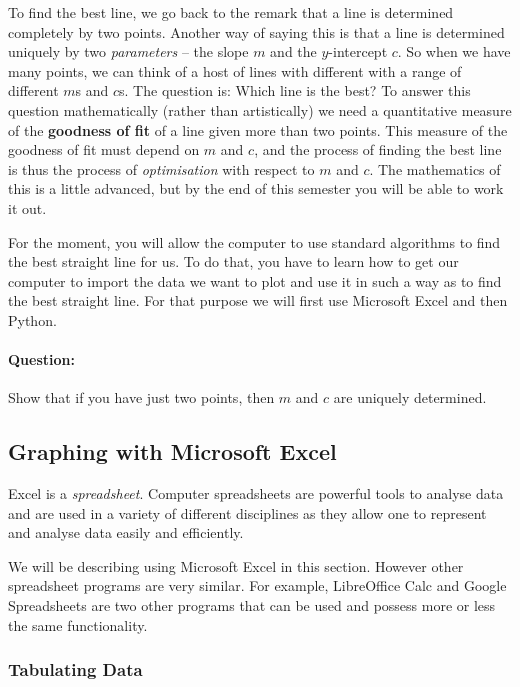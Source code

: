 To find the best line, we go back to the remark that a line is determined completely by two points. Another way of saying this is that a line is determined uniquely by two \textit{parameters} -- the slope $m$ and the $y$-intercept $c$. So when we have many points, we can think of a host of lines with different with a range of different $m$s and $c$s. The question is: Which line is the best? To answer this question mathematically (rather than artistically) we need a quantitative measure of the \textbf{goodness of fit} of a line given more than two points. This measure of the goodness of fit must depend on $m$ and $c$, and the process of finding the best line is thus the process of \textit{optimisation} with respect to $m$ and $c$. The mathematics of this is a little advanced, but by the end of this semester you will be able to work it out. 

For the moment, you will allow the computer to use standard algorithms to find the best straight line for us. To do that, you have to learn how to get our computer to import the data we want to plot and use it in such a way as to find the best straight line. For that purpose we will first use Microsoft Excel and then Python. 

\begin{question}
\paragraph{Question:} Show that if you have just two points, then $m$ and $c$ are uniquely determined. 
\end{question}


\subsection{Graphing with Microsoft Excel}

Excel is a \textit{spreadsheet}. Computer spreadsheets are powerful tools to analyse data and are used in a variety of different disciplines as they allow one to represent and analyse data easily and efficiently. 

\begin{tip}
We will be describing using Microsoft Excel in this section. However other spreadsheet programs are very similar. For example, LibreOffice Calc and Google Spreadsheets are two other programs that can be used and possess more or less the same functionality.
\end{tip}

\subsubsection{Tabulating Data}

